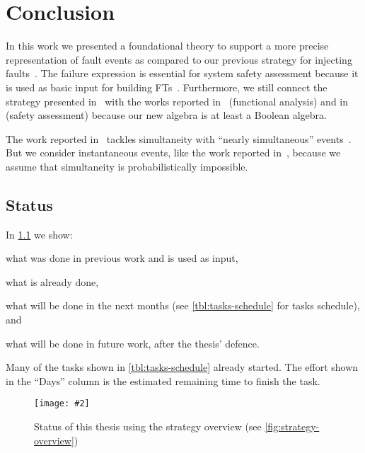 \documentclass[12pt,openright,twoside,a4paper,oldfontcommands,english,brazil,draft]{abntex2}
\theoremstyle{theo}
\newcommand{\includegraphicsaspectratio}[2][1]{%
  \texttt{[image: \#2]}%
}
\newcommand{\simulink}{Simulink\xspace}
\begin{document}
\chapter{Conclusion}
\label{sec:conclusion}

In this work we presented a foundational theory to support a more precise representation of fault events as compared to our previous strategy for injecting faults~\cite{DM2012}.
%
The failure expression is essential for system safety assessment because it is used as basic input for building \aclp{FT}~\cite{PMS+2001,JMS+2011,GMS+2010}.
%
%
Furthermore, we still connect the strategy presented in~\cite{MJG+2010} with the works reported in~\cite{JMS+2011} (functional analysis) and in~\cite{GMS+2010,PMS+2001} (safety assessment) because our new algebra is at least a Boolean algebra.

\begin{sloppypar}
The work reported in~\cite{Walker2009,WP2009,WP2010} tackles simultaneity with ``nearly simultaneous'' events~\cite{EWG2013}.
But we consider instantaneous events, like the work reported in~\cite{MRL2014}, because we assume that simultaneity is probabilistically impossible.
\end{sloppypar}

\section{Status}

In \cref{fig:status-of-thesis} we show:
\begin{alineasinline}
  \item what was done in previous work and is used as input,
  \item what is already done,
  \item what will be done in the next months (see \cref{tbl:tasks-schedule} for tasks schedule), and
  \item what will be done in future work, after the thesis' defence.
\end{alineasinline}
Many of the tasks shown in \cref{tbl:tasks-schedule} already started.
The effort shown in the ``Days'' column is the estimated remaining time to finish the task.


\begin{figure}[t]
  \centering
  \includegraphicsaspectratio[0.9]{StrategyOverview-Status}
  \caption{Status of this thesis using the strategy overview (see \cref{fig:strategy-overview})}
  \label{fig:status-of-thesis}
\end{figure}
\end{document}
